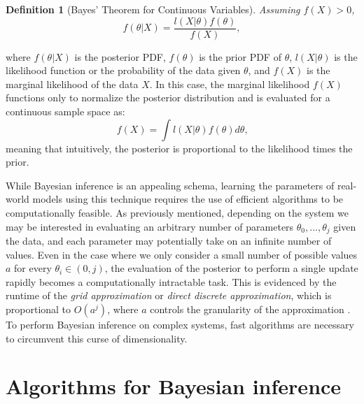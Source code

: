 \documentclass[
  12pt,
  twoside]{book}
\theoremstyle{definition}
\newtheorem{definition}{Definition}[chapter]
\theoremstyle{definition}
\theoremstyle{definition}
\theoremstyle{remark}
\begin{document}
\begin{definition}[Bayes' Theorem for Continuous Variables]
\protect\hypertarget{def:bayesprob}{}{\label{def:bayesprob} {} }\emph{Assuming \(f(X)>0\),}
\[f(\theta|X)=\frac{l(X|\theta)f(\theta)}{f(X)},\]
\end{definition}
where \(f(\theta|X)\) is the posterior PDF, \(f(\theta)\) is the prior PDF of \(\theta\), \(l(X|\theta)\) is the likelihood function or the probability of the data given \(\theta\), and \(f(X)\) is the marginal likelihood of the data \(X\).
In this case, the marginal likelihood \(f(X)\) functions only to normalize the posterior distribution and is evaluated for a continuous sample space as:
\[f(X)=\int l(X|\theta)f(\theta)d\theta \textrm{,}\]
meaning that intuitively, the posterior is proportional to the likelihood times the prior.

While Bayesian inference is an appealing schema, learning the parameters of real-world models using this technique requires the use of efficient algorithms to be computationally feasible.
As previously mentioned, depending on the system we may be interested in evaluating an arbitrary number of parameters \(\theta_0, ..., \theta_j\) given the data, and each parameter may potentially take on an infinite number of values.
Even in the case where we only consider a small number of possible values \(a\) for every \(\theta_i \in (0,j)\), the evaluation of the posterior to perform a single update rapidly becomes a computationally intractable task.
This is evidenced by the runtime of the \emph{grid approximation} or \emph{direct discrete approximation}, which is proportional to \(O(a^{j})\), where \(a\) controls the granularity of the approximation \citep[  10.1]{Gelman2013}.
To perform Bayesian inference on complex systems, fast algorithms are necessary to circumvent this curse of dimensionality.

\hypertarget{algorithms-for-bayesian-inference}{%
\chapter{Algorithms for Bayesian inference}\label{algorithms-for-bayesian-inference}}
\end{document}
